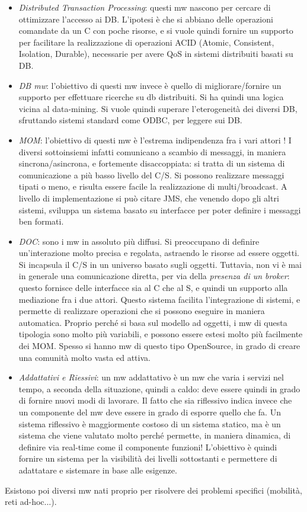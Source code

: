 \begin{itemize}
 \item \textit{Distributed Transaction Processing}: questi mw nascono per cercare di ottimizzare l'accesso ai DB.
 L'ipotesi è che si abbiano delle operazioni comandate da un C con poche risorse, e si vuole quindi fornire un supporto
 per facilitare la realizzazione di operazioni ACID (Atomic, Consistent, Isolation, Durable), necessarie per avere 
 QoS in sistemi distribuiti basati su DB.
 \item \textit{DB mw}: l'obiettivo di questi mw invece è quello di migliorare/fornire un supporto per effettuare
 ricerche su db distribuiti. Si ha quindi una logica vicina al data-mining. Si vuole quindi superare l'eterogeneità 
 dei diversi DB, sfruttando sistemi standard come ODBC, per leggere sui DB.
 \item \textit{MOM}: l'obiettivo di questi mw è l'estrema indipendenza fra i vari attori ! I diversi sottoinsiemi
 infatti comunicano a scambio di messaggi, in maniera sincrona/asincrona, e fortemente disaccoppiata: si tratta di un
 sistema di comunicazione a più basso livello del C/S. Si possono realizzare messaggi tipati o meno, e risulta essere
 facile la realizzazione di multi/broadcast. 
 A livello di implementazione si può citare JMS, che venendo dopo gli altri sistemi, sviluppa un sistema basato su
 interfacce per poter definire i messaggi ben formati.
 \item \textit{DOC}: sono i mw in assoluto più diffusi. Si preoccupano di definire un'interazione molto precisa e
 regolata, astraendo le risorse ad essere oggetti. 
 Si incapsula il C/S in un universo basato sugli oggetti. Tuttavia, non vi è mai in generale una comunicazione diretta,
 per via della \textit{presenza di un broker}: questo fornisce delle interfacce sia al C che al S, e quindi un supporto
 alla mediazione fra i due attori. Questo sistema facilita l'integrazione di sistemi, e permette di realizzare
 operazioni che si possono eseguire in maniera automatica.
 Proprio perché si basa sul modello ad oggetti, i mw di questa tipologia sono molto più variabili, e possono essere
 estesi molto più facilmente dei MOM. Spesso si hanno mw di questo tipo OpenSource, in grado di creare una comunità
 molto vasta ed attiva.
 \item \textit{Addattativi e Riessivi}: un mw addattativo è un mw che varia i servizi nel tempo, a seconda della
 situazione, quindi a caldo: deve essere quindi in grado di fornire nuovi modi di lavorare.
 Il fatto che sia riflessivo indica invece che un componente del mw deve essere in grado di esporre quello che fa. Un
 sistema riflessivo è maggiormente costoso di un sistema statico, ma è un sistema che viene valutato molto
 perché permette, in maniera dinamica, di definire via real-time come il componente funzioni!
 L'obiettivo è quindi fornire un sistema per la visibilità dei livelli sottostanti e permettere di adattatare e
 sistemare in base alle esigenze.
\end{itemize}
Esistono poi diversi mw nati proprio per risolvere dei problemi specifici (mobilità, reti ad-hoc...).

